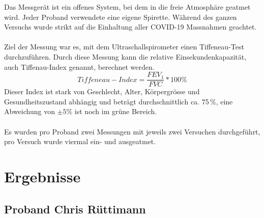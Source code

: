 \documentclass[11pt]{scrartcl}
\begin{document}
    Das Messgerät ist ein offenes System, bei dem in die freie Atmosphäre geatmet wird.
    Jeder Proband verwendete eine eigene Spirette.
    Während des ganzen Versuchs wurde strikt auf die Einhaltung aller COVID-19 Massnahmen geachtet.\\\\
    Ziel der Messung war es, mit dem Ultraschallspirometer einen Tiffeneau-Test durchzuführen.
    Durch diese Messung kann die relative Einsekundenkapazität, auch Tiffenau-Index genannt, berechnet werden.
    \begin{equation}
        Tiffeneau-Index = \frac{FEV_{1}}{FVC} * 100\%
    \end{equation}
    Dieser Index ist stark von Geschlecht, Alter, Körpergrösse und Gesundheitszustand abhängig und beträgt
    durchschnittlich ca.
    75\,\%, eine Abweichung von $\pm 5\%$ ist noch im grüne Bereich.\\\\
    Es wurden pro Proband zwei Messungen mit jeweils zwei Versuchen durchgeführt, pro Versuch wurde viermal ein- und
    ausgeatmet.

    \section{Ergebnisse}
    \subsection{Proband Chris Rüttimann}
\end{document}
